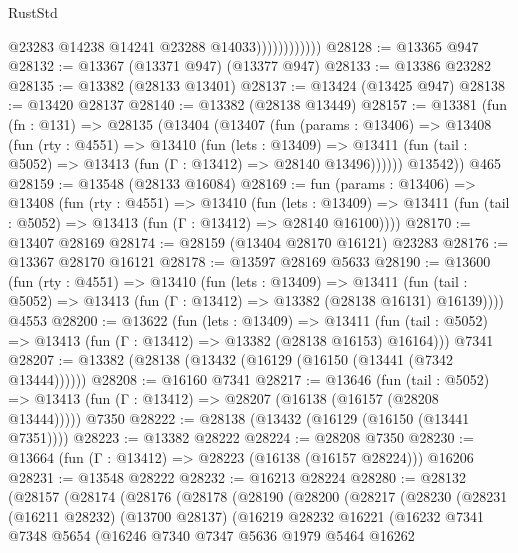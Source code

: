 \begin{lexlean}{RustStd}
\begin{coremodule}
                            @23283
                            @14238
                            @14241
                            @23288
                            @14033))))))))))))
@28128 := @13365 @947
@28132 := @13367 (@13371 @947) (@13377 @947)
@28133 := @13386 @23282
@28135 := @13382 (@28133 @13401)
@28137 := @13424 (@13425 @947)
@28138 := @13420 @28137
@28140 := @13382 (@28138 @13449)
@28157 := @13381
    (fun (fn : @131) =>
    @28135
      (@13404
        (@13407
          (fun (params : @13406) =>
          @13408
            (fun (rty : @4551) =>
            @13410
              (fun (lets : @13409) =>
              @13411 (fun (tail : @5052) => @13413 (fun (Γ : @13412) => @28140 @13496))))))
        @13542))
    @465
@28159 := @13548 (@28133 @16084)
@28169 := fun (params : @13406) =>
  @13408
    (fun (rty : @4551) =>
    @13410
      (fun (lets : @13409) =>
      @13411 (fun (tail : @5052) => @13413 (fun (Γ : @13412) => @28140 @16100))))
@28170 := @13407 @28169
@28174 := @28159 (@13404 @28170 @16121) @23283
@28176 := @13367 @28170 @16121
@28178 := @13597 @28169 @5633
@28190 := @13600
    (fun (rty : @4551) =>
    @13410
      (fun (lets : @13409) =>
      @13411 (fun (tail : @5052) => @13413 (fun (Γ : @13412) => @13382 (@28138 @16131) @16139))))
    @4553
@28200 := @13622
    (fun (lets : @13409) =>
    @13411 (fun (tail : @5052) => @13413 (fun (Γ : @13412) => @13382 (@28138 @16153) @16164)))
    @7341
@28207 := @13382 (@28138 (@13432 (@16129 (@16150 (@13441 (@7342 @13444))))))
@28208 := @16160 @7341
@28217 := @13646
    (fun (tail : @5052) => @13413 (fun (Γ : @13412) => @28207 (@16138 (@16157 (@28208 @13444)))))
    @7350
@28222 := @28138 (@13432 (@16129 (@16150 (@13441 @7351))))
@28223 := @13382 @28222
@28224 := @28208 @7350
@28230 := @13664 (fun (Γ : @13412) => @28223 (@16138 (@16157 @28224))) @16206
@28231 := @13548 @28222
@28232 := @16213 @28224
@28280 := @28132
    (@28157
      (@28174
        (@28176
          (@28178
            (@28190
              (@28200
                (@28217
                  (@28230
                    (@28231
                      (@16211 @28232)
                      (@13700 @28137)
                      (@16219
                        @28232
                        @16221
                        (@16232
                          @7341
                          @7348
                          @5654
                          (@16246
                            @7340
                            @7347
                            @5636
                            @1979
                            @5464
                            @16262

\end{coremodule}
\end{lexlean}
